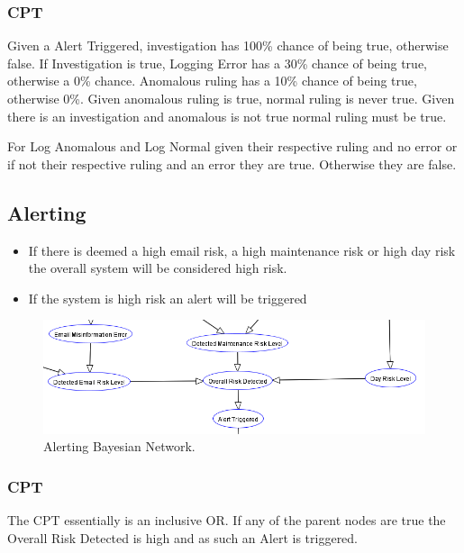 \documentclass[10pt,a4paper]{article}
\begin{document}
\subsubsection{CPT}

Given a Alert Triggered, investigation has 100\% chance of being true, otherwise false. If Investigation is true, Logging Error has a 30\% chance of being true, otherwise a 0\% chance. Anomalous ruling has a 10\% chance of being true, otherwise 0\%. Given anomalous ruling is true, normal ruling is never true. Given there is an investigation and anomalous is not true normal ruling must be true.

For Log Anomalous and Log Normal given their respective ruling and no error or if not their respective ruling and an error they are true. Otherwise they are false.

\subsection{Alerting}

\begin{itemize}
\item If there is deemed a high email risk, a high maintenance risk or high day risk the overall system will be considered high risk.
\item If the system is high risk an alert will be triggered
\end{itemize}

\begin{figure}
\centering
  \includegraphics[width = \linewidth]{alarm_network.png}
  \caption{Alerting Bayesian Network.}
  \label{fig:alerting_network}
\end{figure}

\subsubsection{CPT}

The CPT essentially is an inclusive OR. If any of the parent nodes are true the Overall Risk Detected is high and as such an Alert is triggered.
\end{document}
